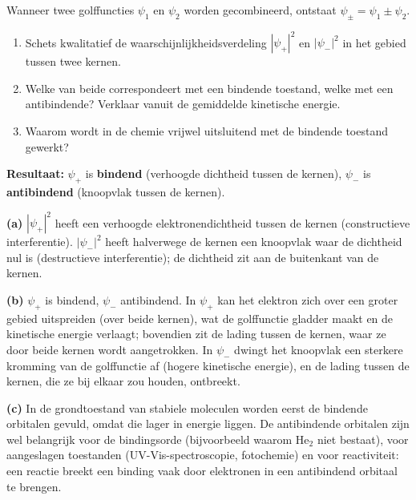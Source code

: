 \begin{oefening}
Wanneer twee golffuncties \(\psi_1\) en \(\psi_2\) worden gecombineerd, ontstaat \(\psi_{\pm} = \psi_1 \pm \psi_2\).

\begin{enumerate}
\item[(a)]
  Schets kwalitatief de waarschijnlijkheidsverdeling \(|\psi_+|^2\) en \(|\psi_-|^2\) in het gebied tussen twee kernen.
\item[(b)]
  Welke van beide correspondeert met een bindende toestand, welke met een antibindende? Verklaar vanuit de gemiddelde kinetische energie.
\item[(c)]
  Waarom wordt in de chemie vrijwel uitsluitend met de bindende toestand gewerkt?
\end{enumerate}
\end{oefening}
\begin{oplossing}
\textbf{Resultaat:} \(\psi_+\) is \textbf{bindend} (verhoogde dichtheid tussen de kernen), \(\psi_-\) is \textbf{antibindend} (knoopvlak tussen de kernen).

\textbf{(a)} \(|\psi_+|^2\) heeft een verhoogde elektronendichtheid tussen de kernen (constructieve interferentie). \(|\psi_-|^2\) heeft halverwege de kernen een knoopvlak waar de dichtheid nul is (destructieve interferentie); de dichtheid zit aan de buitenkant van de kernen.

\textbf{(b)} \(\psi_+\) is bindend, \(\psi_-\) antibindend. In \(\psi_+\) kan het elektron zich over een groter gebied uitspreiden (over beide kernen), wat de golffunctie gladder maakt en de kinetische energie verlaagt; bovendien zit de lading tussen de kernen, waar ze door beide kernen wordt aangetrokken. In \(\psi_-\) dwingt het knoopvlak een sterkere kromming van de golffunctie af (hogere kinetische energie), en de lading tussen de kernen, die ze bij elkaar zou houden, ontbreekt.

\textbf{(c)} In de grondtoestand van stabiele moleculen worden eerst de bindende orbitalen gevuld, omdat die lager in energie liggen. De antibindende orbitalen zijn wel belangrijk voor de bindingsorde (bijvoorbeeld waarom \(\mathrm{He_2}\) niet bestaat), voor aangeslagen toestanden (UV-Vis-spectroscopie, fotochemie) en voor reactiviteit: een reactie breekt een binding vaak door elektronen in een antibindend orbitaal te brengen.
\end{oplossing}

